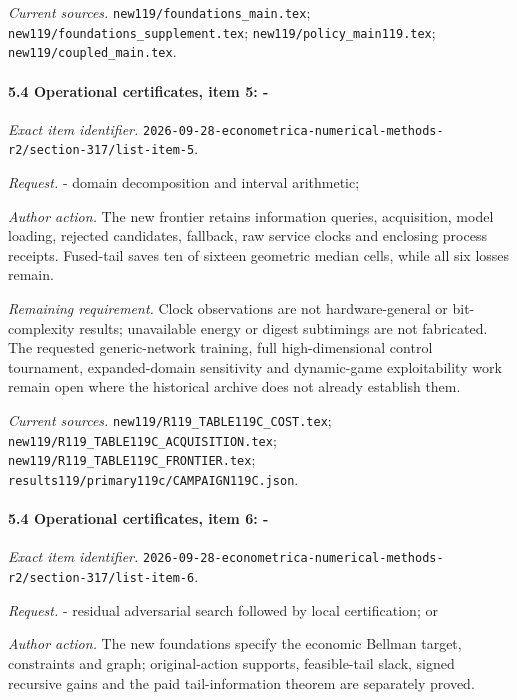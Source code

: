 \par\emph{Current sources.} \nolinkurl{new119/foundations_main.tex}; \nolinkurl{new119/foundations_supplement.tex}; \nolinkurl{new119/policy_main119.tex}; \nolinkurl{new119/coupled_main.tex}.

\paragraph{5.4 Operational certificates, item 5: -}

\emph{Exact item identifier.} \nolinkurl{2026-09-28-econometrica-numerical-methods-r2/section-317/list-item-5}.

\par\emph{Request.} - domain decomposition and interval arithmetic;

\par\emph{Author action.} The new frontier retains information queries, acquisition, model loading, rejected candidates, fallback, raw service clocks and enclosing process receipts. Fused-tail saves ten of sixteen geometric median cells, while all six losses remain.

\par\emph{Remaining requirement.} Clock observations are not hardware-general or bit-complexity results; unavailable energy or digest subtimings are not fabricated. The requested generic-network training, full high-dimensional control tournament, expanded-domain sensitivity and dynamic-game exploitability work remain open where the historical archive does not already establish them.

\par\emph{Current sources.} \nolinkurl{new119/R119_TABLE119C_COST.tex}; \nolinkurl{new119/R119_TABLE119C_ACQUISITION.tex}; \nolinkurl{new119/R119_TABLE119C_FRONTIER.tex}; \nolinkurl{results119/primary119c/CAMPAIGN119C.json}.

\paragraph{5.4 Operational certificates, item 6: -}

\emph{Exact item identifier.} \nolinkurl{2026-09-28-econometrica-numerical-methods-r2/section-317/list-item-6}.

\par\emph{Request.} - residual adversarial search followed by local certification; or

\par\emph{Author action.} The new foundations specify the economic Bellman target, constraints and graph; original-action supports, feasible-tail slack, signed recursive gains and the paid tail-information theorem are separately proved.

